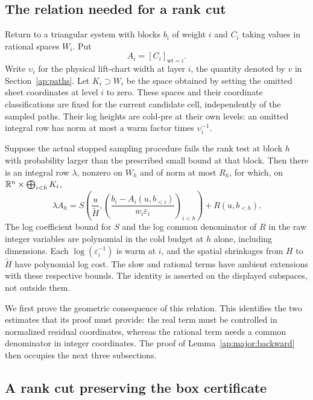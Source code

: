 \subsection{The relation needed for a rank cut}


Return to a triangular system with blocks $b_i$ of weight $i$ and
$C_i$ taking values in rational spaces $W_i$.  Put
\[
                         A_i=[C_i]_{\mathrm{wt}=i}.
\]
Write $\upsilon_i$ for the physical lift-chart width at layer $i$,
the quantity denoted by $v$ in Section~\ref{ap:paths}.
Let $K_i\supset W_i$ be the space obtained by setting the omitted
sheet coordinates at level $i$ to zero.  These spaces and their
coordinate classifications are fixed for the current candidate cell,
independently of the sampled paths.  Their log heights are cold-pre
at their own levels: an omitted integral row has norm at most a warm
factor times $\upsilon_i^{-1}$.

\begin{lemma}\label{ap:major:backward}
Suppose the actual stopped sampling procedure fails the rank test
at block $h$ with probability larger than the prescribed small
bound at that block.  Then there is an integral row $\lambda$,
nonzero on $W_h$ and of norm at most $R_h$, for which, on
$\mathbb R^n\times\bigoplus_{i<h}K_i$,
\begin{equation}\label{ap:major:root-relation}
 \lambda A_h=
 S\left(\frac{u}{\widetilde H},
       \left(\frac{b_i-A_i(u,b_{<i})}{w_i\varepsilon_i}\right)_{i<h}
       \right)+R(u,b_{<h}).
\end{equation}
The log coefficient bound for $S$ and the log common denominator of
$R$ in the raw integer variables are polynomial in the cold budget
at $h$ alone, including dimensions.  Each
$\log(\varepsilon_i^{-1})$ is warm at $i$, and the spatial shrinkages
from $H$ to $\widetilde H$ have polynomial log cost.  The slow and
rational terms have ambient extensions with these respective bounds.
The identity is asserted on the displayed subspaces, not outside them.
\end{lemma}

We first prove the geometric consequence of this relation. This
identifies the two estimates that its proof must provide: the real
term must be controlled in normalized residual coordinates, whereas
the rational term needs a common denominator in integer coordinates.
The proof of Lemma~\ref{ap:major:backward} then occupies the next
three subsections.

\subsection{A rank cut preserving the box certificate}

